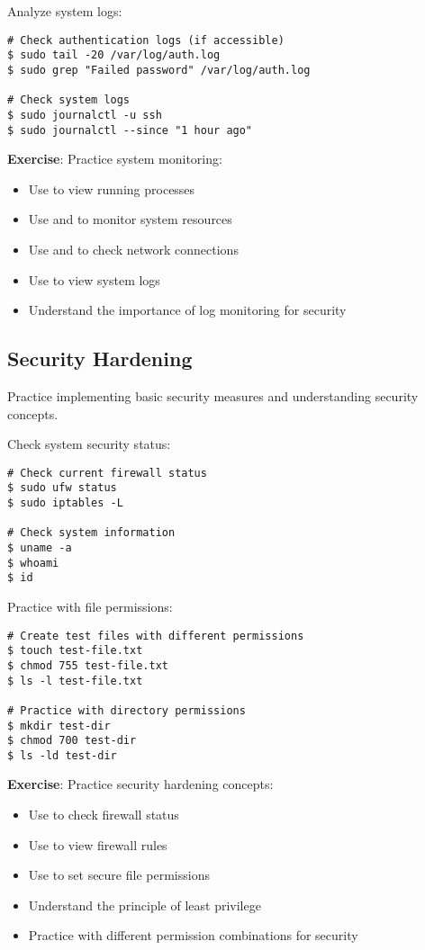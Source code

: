 Analyze system logs:

\begin{lstlisting}[style=bashstyle]
# Check authentication logs (if accessible)
$ sudo tail -20 /var/log/auth.log
$ sudo grep "Failed password" /var/log/auth.log

# Check system logs
$ sudo journalctl -u ssh
$ sudo journalctl --since "1 hour ago"
\end{lstlisting}

\textbf{Exercise}: Practice system monitoring:
\begin{itemize}
    \item Use  to view running processes
    \item Use  and  to monitor system resources
    \item Use  and  to check network connections
    \item Use  to view system logs
    \item Understand the importance of log monitoring for security
\end{itemize}

\subsection{Security Hardening}

Practice implementing basic security measures and understanding security concepts.

Check system security status:

\begin{lstlisting}[style=bashstyle]
# Check current firewall status
$ sudo ufw status
$ sudo iptables -L

# Check system information
$ uname -a
$ whoami
$ id
\end{lstlisting}

Practice with file permissions:

\begin{lstlisting}[style=bashstyle]
# Create test files with different permissions
$ touch test-file.txt
$ chmod 755 test-file.txt
$ ls -l test-file.txt

# Practice with directory permissions
$ mkdir test-dir
$ chmod 700 test-dir
$ ls -ld test-dir
\end{lstlisting}

\textbf{Exercise}: Practice security hardening concepts:
\begin{itemize}
    \item Use  to check firewall status
    \item Use  to view firewall rules
    \item Use  to set secure file permissions
    \item Understand the principle of least privilege
    \item Practice with different permission combinations for security
\end{itemize}

